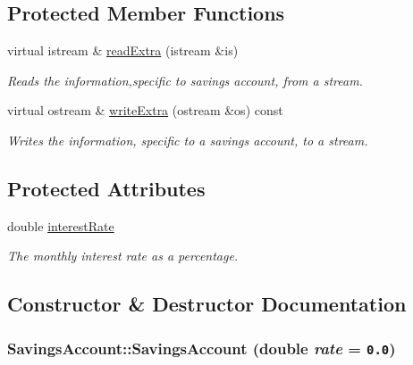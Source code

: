 \subsection*{Protected Member Functions}
\begin{CompactItemize}
\item 
virtual istream \& \hyperlink{classSavingsAccount_3afc54ec8471fb44d804750ebe63e1c9}{readExtra} (istream \&is)
\begin{CompactList}\small\item\em Reads the information,specific to savings account, from a stream. \item\end{CompactList}\item 
virtual ostream \& \hyperlink{classSavingsAccount_6a2fce79d1bde2580c291847ec1cf989}{writeExtra} (ostream \&os) const 
\begin{CompactList}\small\item\em Writes the information, specific to a savings account, to a stream. \item\end{CompactList}\end{CompactItemize}
\subsection*{Protected Attributes}
\begin{CompactItemize}
\item 
\hypertarget{classSavingsAccount_de464fb646c70277052a60e9d098f511}{
double \hyperlink{classSavingsAccount_de464fb646c70277052a60e9d098f511}{interestRate}}
\label{classSavingsAccount_de464fb646c70277052a60e9d098f511}

\begin{CompactList}\small\item\em The monthly interest rate as a percentage. \item\end{CompactList}\end{CompactItemize}


\subsection{Constructor \& Destructor Documentation}
\hypertarget{classSavingsAccount_b7517ac4a985dc029f2587109c984482}{
\subsubsection[SavingsAccount]{\setlength{\rightskip}{0pt plus 5cm}SavingsAccount::SavingsAccount (double {\em rate} = {\tt 0.0})}}
\label{classSavingsAccount_b7517ac4a985dc029f2587109c984482}


